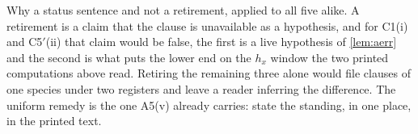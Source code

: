 Why a status sentence and not a retirement, applied to all five alike. A retirement is a claim that the
clause is unavailable as a hypothesis, and for C1(i) and C5$'$(ii) that claim would be false, the first is a
live hypothesis of \cref{lem:aerr} and the second is what puts the lower end on the $h_x$ window the two
printed computations above read. Retiring the remaining three alone would file clauses of one species under two
registers and leave a reader inferring the difference. The uniform remedy is the one A5(v) already
carries: state the standing, in one place, in the printed text.

